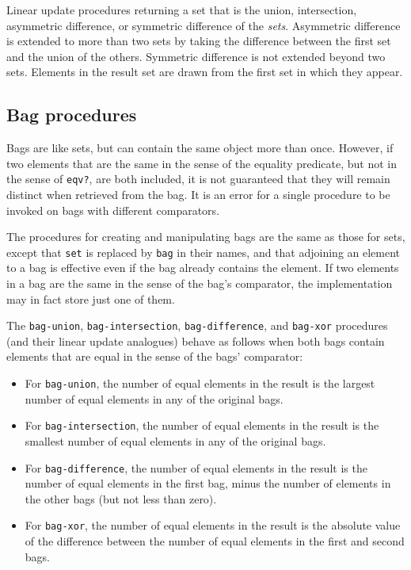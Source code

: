 \begin{entry}{%
  }

  Linear update procedures returning a set that is the union,
  intersection, asymmetric difference, or symmetric difference of the
  \emph{sets}. Asymmetric difference is extended to more than two sets
  by taking the difference between the first set and the union of the
  others.  Symmetric difference is not extended beyond two
  sets. Elements in the result set are drawn from the first set in
  which they appear.
\end{entry}

\subsection{Bag procedures}\label{Bagprocedures}

Bags are like sets, but can contain the same object more than once.
However, if two elements that are the same in the sense of the equality
predicate, but not in the sense of \texttt{eqv?}, are both included, it
is not guaranteed that they will remain distinct when retrieved from the
bag. It is an error for a single procedure to be invoked on bags with
different comparators.


The procedures for creating and manipulating bags are the same as those
for sets, except that \texttt{set} is replaced by \texttt{bag} in their
names, and that adjoining an element to a bag is effective even if the
bag already contains the element. If two elements in a bag are the same
in the sense of the bag's comparator, the implementation may in fact
store just one of them.

The \texttt{bag-union}, \texttt{bag-intersection},
\texttt{bag-difference}, and \texttt{bag-xor} procedures (and their
linear update analogues) behave as follows when both bags contain
elements that are equal in the sense of the bags' comparator:

\begin{itemize}
\item
  For \texttt{bag-union}, the number of equal elements in the result is
  the largest number of equal elements in any of the original bags.
\item
  For \texttt{bag-intersection}, the number of equal elements in the
  result is the smallest number of equal elements in any of the original
  bags.
\item
  For \texttt{bag-difference}, the number of equal elements in the
  result is the number of equal elements in the first bag, minus the
  number of elements in the other bags (but not less than zero).
\item
  For \texttt{bag-xor}, the number of equal elements in the result is
  the absolute value of the difference between the number of equal
  elements in the first and second bags.
\end{itemize}

